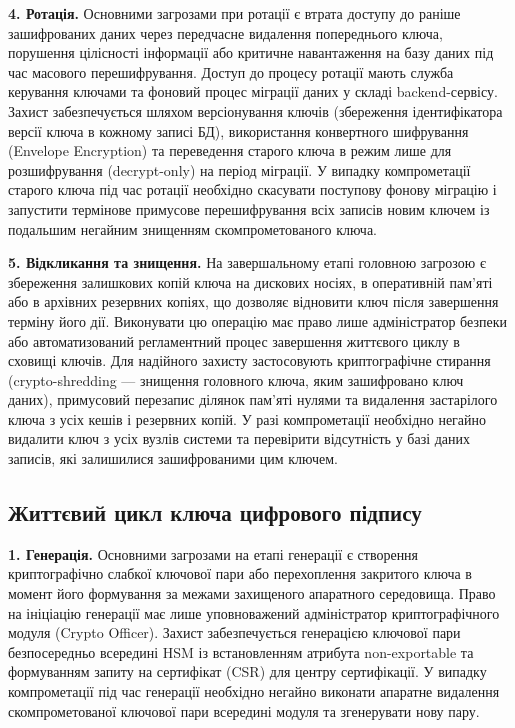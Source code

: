 \textbf{4. Ротація.}
Основними загрозами при ротації є втрата доступу до раніше зашифрованих даних через передчасне
видалення попереднього ключа, порушення цілісності інформації або критичне навантаження на базу даних
під час масового перешифрування. Доступ до процесу ротації мають служба керування ключами та фоновий
процес міграції даних у складі backend-сервісу. Захист забезпечується шляхом версіонування ключів
(збереження ідентифікатора версії ключа в кожному записі БД), використання конвертного шифрування
(Envelope Encryption) та переведення старого ключа в режим лише для розшифрування (decrypt-only) на
період міграції. У випадку компрометації старого ключа під час ротації необхідно скасувати поступову
фонову міграцію і запустити термінове примусове перешифрування всіх записів новим ключем із подальшим
негайним знищенням скомпрометованого ключа.

\textbf{5. Відкликання та знищення.}
На завершальному етапі головною загрозою є збереження залишкових копій ключа на дискових носіях, в
оперативній пам'яті або в архівних резервних копіях, що дозволяє відновити ключ після завершення терміну
його дії. Виконувати цю операцію має право лише адміністратор безпеки або автоматизований регламентний
процес завершення життєвого циклу в сховищі ключів. Для надійного захисту застосовують криптографічне
стирання (crypto-shredding --- знищення головного ключа, яким зашифровано ключ даних), примусовий
перезапис ділянок пам'яті нулями та видалення застарілого ключа з усіх кешів і резервних копій. У разі
компрометації необхідно негайно видалити ключ з усіх вузлів системи та перевірити відсутність у базі даних
записів, які залишилися зашифрованими цим ключем.


\subsection{Життєвий цикл ключа цифрового підпису}

\textbf{1. Генерація.}
Основними загрозами на етапі генерації є створення криптографічно слабкої ключової пари або
перехоплення закритого ключа в момент його формування за межами захищеного апаратного середовища.
Право на ініціацію генерації має лише уповноважений адміністратор криптографічного модуля (Crypto
Officer). Захист забезпечується генерацією ключової пари безпосередньо всередині HSM із встановленням
атрибута non-exportable та формуванням запиту на сертифікат (CSR) для центру сертифікації. У випадку
компрометації під час генерації необхідно негайно виконати апаратне видалення скомпрометованої
ключової пари всередині модуля та згенерувати нову пару.

